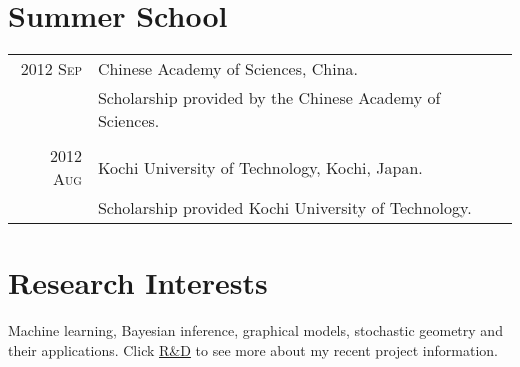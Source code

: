 \documentclass[a4paper,10pt]{article}
\begin{document}
\section{Summer School}
\begin{tabular}{r|p{13cm}}

  \textsc{2012 Sep}  & Chinese Academy of Sciences, China. \\
                     & Scholarship provided by the Chinese Academy of Sciences. \\
  \multicolumn{2}{c}{}\\
  \textsc{2012 Aug}  & Kochi University of Technology, Kochi, Japan. \\
                     & Scholarship provided Kochi University of Technology.
\end{tabular}

\section{Research Interests}
Machine learning, Bayesian inference, graphical models, stochastic geometry and their applications. Click \href{https://firsthandscientist.github.io/#/research}{R\&D} to see more about my recent project information.

\begin{bibunit}
  \renewcommand\refname{Recent Publications (See more at \href{https://scholar.google.com/citations?user=eK9LoQMAAAAJ&hl=en}{my Scholar})}
  \nocite{
    liu2020region,
    liu2020alpha,
    zuxing2020cdc,
    anubhad2020,
    andrea2020,
    liu2020powering,
    honore2020hidden,
    liu2020neural,
    chatterjee2019ssfn,
    liu2019discontinuous,
    liu2019entropy,
    liu2019alpha,
    liu2019dominant,
    liu2018will}

  \footnotesize{\putbib[../bibfile]}
\end{bibunit}

\end{document}
